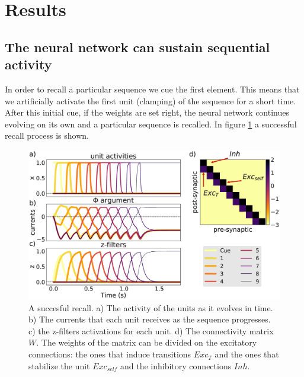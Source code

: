 \documentclass{esannV2}
\begin{document}
 
\section{Results}

\subsection{The neural network can sustain sequential activity}

In order to recall a particular sequence we cue the first element. This means that we artificially activate the first unit (clamping) of the sequence for a short time. After this initial cue, if the weights are set right, the neural network continues evolving on its own and a particular sequence is recalled. In figure \ref{Fig:recall} a successful recall process is shown. 

\begin{figure}[h!]
\centering
\includegraphics[scale=0.20]{recall.eps}
\caption{A succesful recall. a) The activity of the units as it evolves in time. b) The currents that each unit receives as the sequence progresses. c) the z-filters activations for each unit. d) The connectivity matrix $W$. The weights of the matrix can be divided on the excitatory connections: the ones that induce transitions $Exc_{T}$ and the ones that stabilize the unit $Exc_{self}$ and the inhibitory connections $Inh$.}\label{Fig:recall}
\end{figure}

\end{document}
